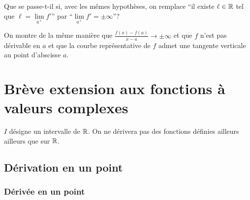 Que se passe-t-il si, avec les mêmes hypothèses, on remplace ``il existe \(\ell 
\in \mathbb{R}\) tel que \(\ell=\lim\limits_{a^+}f'\)'' par ``\(\lim\limits_{a^+} f'=\pm 
\infty\)''?

On montre de la même manière que \(\frac{f(x)-f(a)}{x-a} \to \pm \infty\) et que 
\(f\) n'est pas dérivable en \(a\) et que la courbe représentative de \(f\) 
admet une tangente verticale au point d'abscisse \(a\).

\section{Brève extension aux fonctions à valeurs complexes}

\(I\) désigne un intervalle de \(\mathbb{R}\). On ne dérivera pas des fonctions définies 
ailleurs ailleurs que sur \(\mathbb{R}\).

\subsection{Dérivation en un point}

\subsubsection{Dérivée en un point}

